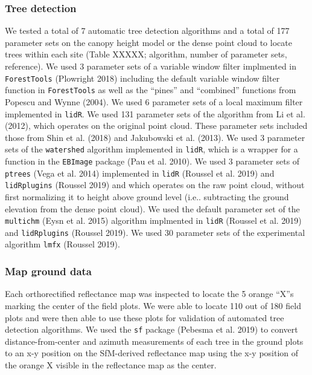 \documentclass[]{article}
\begin{document}
\subsubsection{Tree detection}\label{tree-detection}

We tested a total of 7 automatic tree detection algorithms and a total
of 177 parameter sets on the canopy height model or the dense point
cloud to locate trees within each site (Table XXXXX; algorithm, number
of parameter sets, reference). We used 3 parameter sets of a variable
window filter implmented in \texttt{ForestTools} (Plowright 2018)
including the default variable window filter function in
\texttt{ForestTools} as well as the ``pines'' and ``combined'' functions
from Popescu and Wynne (2004). We used 6 parameter sets of a local
maximum filter implemented in \texttt{lidR}. We used 131 parameter sets
of the algorithm from Li et al. (2012), which operates on the original
point cloud. These parameter sets included those from Shin et al. (2018)
and Jakubowski et al. (2013). We used 3 parameter sets of the
\texttt{watershed} algorithm implemented in \texttt{lidR}, which is a
wrapper for a function in the \texttt{EBImage} package (Pau et al.
2010). We used 3 parameter sets of \texttt{ptrees} (Vega et al. 2014)
implemented in \texttt{lidR} (Roussel et al. 2019) and
\texttt{lidRplugins} (Roussel 2019) and which operates on the raw point
cloud, without first normalizing it to height above ground level (i.e..
subtracting the ground elevation from the dense point cloud). We used
the default parameter set of the \texttt{multichm} (Eysn et al. 2015)
algorithm implmented in \texttt{lidR} (Roussel et al. 2019) and
\texttt{lidRplugins} (Roussel 2019). We used 30 parameter sets of the
experimental algorithm \texttt{lmfx} (Roussel 2019).

\subsubsection{Map ground data}\label{map-ground-data}

Each orthorectified reflectance map was inspected to locate the 5 orange
``X''s marking the center of the field plots. We were able to locate 110
out of 180 field plots and were then able to use these plots for
validation of automated tree detection algorithms. We used the
\texttt{sf} package (Pebesma et al. 2019) to convert
distance-from-center and azimuth measurements of each tree in the ground
plots to an x-y position on the SfM-derived reflectance map using the
x-y position of the orange X visible in the reflectance map as the
center.
\end{document}
